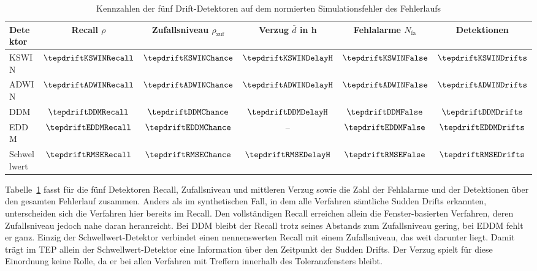 %
\begin{table}[tbp]
\centering
\caption{Kennzahlen der fünf Drift-Detektoren auf dem normierten Simulationsfehler des Fehlerlaufs}
\label{tab:tep_detection_stats}
\begin{tabular}{lccccc}
\toprule
\textbf{Detektor} & Recall $\rho$ & Zufallsniveau $\rho_{\mathrm{zuf}}$ & Verzug $\bar{d}$ in \si{\hour} & Fehlalarme $N_{\mathrm{fa}}$ & Detektionen \\
\midrule
\ac{KSWIN} & $\tepdriftKSWINRecall$ & $\tepdriftKSWINChance$ & $\tepdriftKSWINDelayH$ & $\tepdriftKSWINFalse$ & $\tepdriftKSWINDrifts$ \\
\ac{ADWIN} & $\tepdriftADWINRecall$ & $\tepdriftADWINChance$ & $\tepdriftADWINDelayH$ & $\tepdriftADWINFalse$ & $\tepdriftADWINDrifts$ \\
\ac{DDM}   & $\tepdriftDDMRecall$   & $\tepdriftDDMChance$   & $\tepdriftDDMDelayH$   & $\tepdriftDDMFalse$   & $\tepdriftDDMDrifts$   \\
\ac{EDDM}  & $\tepdriftEDDMRecall$  & $\tepdriftEDDMChance$  & --                     & $\tepdriftEDDMFalse$  & $\tepdriftEDDMDrifts$  \\
Schwellwert & $\tepdriftRMSERecall$ & $\tepdriftRMSEChance$  & $\tepdriftRMSEDelayH$  & $\tepdriftRMSEFalse$  & $\tepdriftRMSEDrifts$  \\
\bottomrule
\end{tabular}
\vspace{3mm}
\end{table}
%
Tabelle~\ref{tab:tep_detection_stats} fasst für die fünf Detektoren Recall, Zufallsniveau und mittleren Verzug sowie die Zahl der Fehlalarme und der Detektionen über den gesamten Fehlerlauf zusammen. Anders als im synthetischen Fall, in dem alle Verfahren sämtliche Sudden Drifts erkannten, unterscheiden sich die Verfahren hier bereits im Recall. Den vollständigen Recall erreichen allein die Fenster-basierten Verfahren, deren Zufallsniveau jedoch nahe daran heranreicht. Bei \ac{DDM} bleibt der Recall trotz seines Abstands zum Zufallsniveau gering, bei \ac{EDDM} fehlt er ganz. Einzig der Schwellwert-Detektor verbindet einen nennenswerten Recall mit einem Zufallsniveau, das weit darunter liegt. Damit trägt im \ac{TEP} allein der Schwellwert-Detektor eine Information über den Zeitpunkt der Sudden Drifts. Der Verzug spielt für diese Einordnung keine Rolle, da er bei allen Verfahren mit Treffern innerhalb des Toleranzfensters bleibt. \par
%
